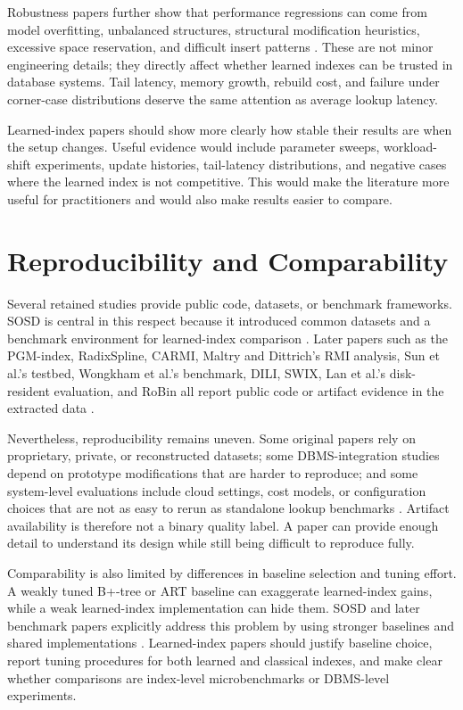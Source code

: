 \documentclass[a4paper, 12pt, twoside]{report}
\begin{document}
Robustness papers further show that performance regressions can come from model overfitting, unbalanced structures, structural modification heuristics, excessive space reservation, and difficult insert patterns \cite{luo2025robustness}. These are not minor engineering details; they directly affect whether learned indexes can be trusted in database systems. Tail latency, memory growth, rebuild cost, and failure under corner-case distributions deserve the same attention as average lookup latency.

Learned-index papers should show more clearly how stable their results are when the setup changes. Useful evidence would include parameter sweeps, workload-shift experiments, update histories, tail-latency distributions, and negative cases where the learned index is not competitive. This would make the literature more useful for practitioners and would also make results easier to compare.

\section{Reproducibility and Comparability}

Several retained studies provide public code, datasets, or benchmark frameworks. SOSD is central in this respect because it introduced common datasets and a benchmark environment for learned-index comparison \cite{marcus2020benchmarking}. Later papers such as the PGM-index, RadixSpline, CARMI, Maltry and Dittrich's RMI analysis, Sun et al.'s testbed, Wongkham et al.'s benchmark, DILI, SWIX, Lan et al.'s disk-resident evaluation, and RoBin all report public code or artifact evidence in the extracted data \cite{ferragina2020pgm,kipf2020radixspline,zhang2022carmi,maltry2022critical,sun2023learned,wongkham2022ready,li2023dili,liang2024swix,lan2023disk,luo2025robustness}.

Nevertheless, reproducibility remains uneven. Some original papers rely on proprietary, private, or reconstructed datasets; some DBMS-integration studies depend on prototype modifications that are harder to reproduce; and some system-level evaluations include cloud settings, cost models, or configuration choices that are not as easy to rerun as standalone lookup benchmarks \cite{chatterjee2024limousine,fuad2026postlearn}. Artifact availability is therefore not a binary quality label. A paper can provide enough detail to understand its design while still being difficult to reproduce fully.

Comparability is also limited by differences in baseline selection and tuning effort. A weakly tuned B+-tree or ART baseline can exaggerate learned-index gains, while a weak learned-index implementation can hide them. SOSD and later benchmark papers explicitly address this problem by using stronger baselines and shared implementations \cite{marcus2020benchmarking,sun2023learned}. Learned-index papers should justify baseline choice, report tuning procedures for both learned and classical indexes, and make clear whether comparisons are index-level microbenchmarks or DBMS-level experiments.
\end{document}
